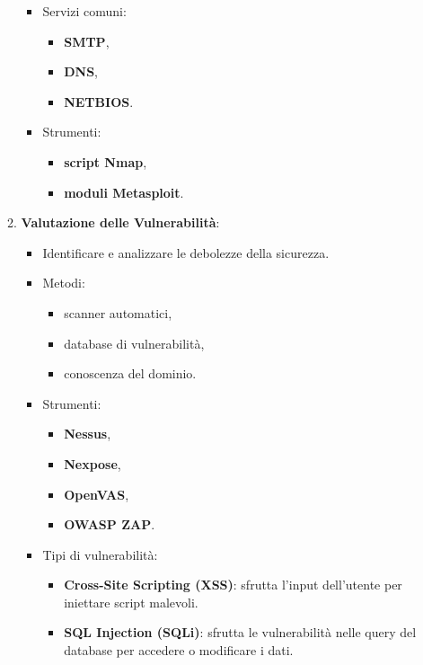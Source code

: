 \documentclass[12pt]{article}
\begin{document}
\begin{enumerate}
\begin{enumerate}
\begin{itemize}
            \item Servizi comuni: 
            \begin{itemize}
                \item \textbf{SMTP},
                \item \textbf{DNS},
                \item \textbf{NETBIOS}.
            \end{itemize}
            \item Strumenti: 
            \begin{itemize}
                \item \textbf{script Nmap},
                \item \textbf{moduli Metasploit}.
            \end{itemize}
        \end{itemize}
        
        \item \textbf{Valutazione delle Vulnerabilit\`{a}}:
        \begin{itemize}
            \item Identificare e analizzare le debolezze della sicurezza.
            \item Metodi: 
            \begin{itemize}
                \item scanner automatici,
                \item database di vulnerabilit\`{a},
                \item  conoscenza del dominio.
            \end{itemize}
            \item Strumenti: 
            \begin{itemize}
                \item \textbf{Nessus},
                \item \textbf{Nexpose},
                \item \textbf{OpenVAS},
                \item \textbf{OWASP ZAP}.
            \end{itemize}
            \item Tipi di vulnerabilit\`{a}:
            \begin{itemize}
                \item \textbf{Cross-Site Scripting (XSS)}: sfrutta l'input 
                dell'utente per iniettare script malevoli.
                \item \textbf{SQL Injection (SQLi)}: sfrutta le vulnerabilit\`{a} 
                nelle query del database per accedere o modificare i dati.
            \end{itemize}
        \end{itemize}
        

\end{enumerate}
\end{enumerate}
\end{document}
